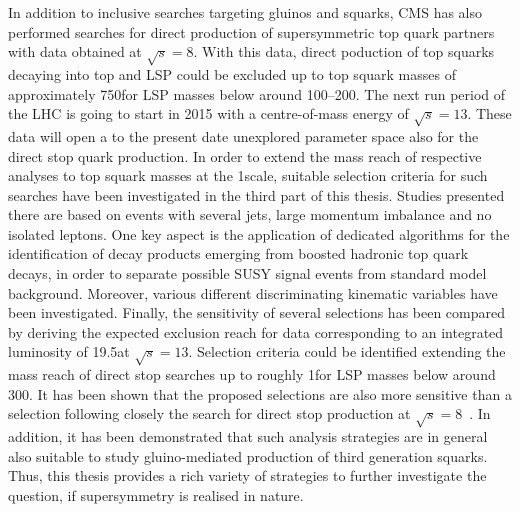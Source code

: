 In addition to inclusive searches targeting gluinos and squarks, CMS has also performed searches for direct production of supersymmetric top quark partners with data obtained at $\sqrt{s} = 8$\tev. With this data, direct poduction of top squarks decaying into top and LSP could be excluded up to top squark masses of approximately 750\gev for LSP masses below around 100--200\gev. The next run period of the LHC is going to start in 2015 with a centre-of-mass energy of $\sqrt{s} = 13$\tev. These data will open a to the present date unexplored parameter space also for the direct stop quark production. In order to extend the mass reach of respective analyses to top squark masses at the 1\tev scale, suitable selection criteria for such searches have been investigated in the third part of this thesis. Studies presented there are based on events with several jets, large momentum imbalance and no isolated leptons. One key aspect is the application of dedicated algorithms for the identification of decay products emerging from boosted hadronic top quark decays, in order to separate possible SUSY signal events from standard model background. Moreover, various different discriminating kinematic variables have been investigated. Finally, the sensitivity of several selections has been compared by deriving the expected exclusion reach for data corresponding to an integrated luminosity of 19.5\fbinv at $\sqrt{s} = 13$\tev. Selection criteria could be identified extending the mass reach of direct stop searches up to roughly 1\tev for LSP masses below around 300\gev. It has been shown that the proposed selections are also more sensitive than a selection following closely the search for direct stop production at $\sqrt{s} = 8$\tev~\cite{CMS-PAS-SUS-13-015}. In addition, it has been demonstrated that such analysis strategies are in general also suitable to study gluino-mediated production of third generation squarks. Thus, this thesis provides a rich variety of strategies to further investigate the question, if supersymmetry is realised in nature. 


